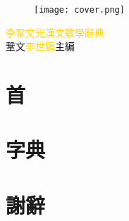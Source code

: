 \documentclass[a5paper,11pt]{report}
\begin{document}
\begin{titlepage}
\doublespacing
\begin{wrapfigure}{r}{50mm}
\texttt{[image: cover.png]}
\end{wrapfigure}
\hfill
\vfill
{\Large\textcolor{gold}{李鞏文光漢文敎學辭典}}\\
{鞏文\textcolor{gold}{李世鎬}\hspace{14pt}主編}
\vspace{64pt}
\end{titlepage}
\addtolength{20mm}
\pagebreak
\chapter*{首}
\doublespacing


\chapter*{字典}
\begin{multicols}{3}
\onehalfspacing

\end{multicols}

\chapter*{謝辭}
\doublespacing

\end{document}
